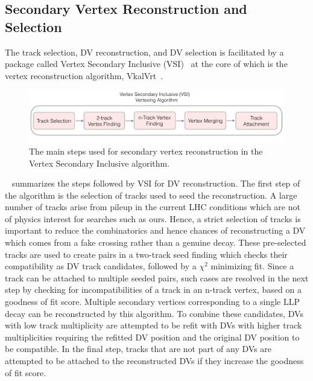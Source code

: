 \subsection{Secondary Vertex Reconstruction and Selection}
The track selection, DV reconstruction, and DV selection is facilitated by a package called Vertex Secondary Inclusive (VSI)~\cite{ATL-PHYS-PUB-2019-013} at the core of which is the vertex reconstruction algorithm, VkalVrt~\cite{Kostyukhin:685551}.

\begin{figure}[!ht]
    \centering
    \includegraphics[width=0.8\linewidth]{figures//analysis_overview/vertexing/VSIalg.png}
    \caption{The main steps used for secondary vertex reconstruction in the Vertex Secondary Inclusive algorithm.~\cite{ATL-PHYS-PUB-2019-013}}
    \label{fig:vsi-steps}
\end{figure}

~ summarizes the steps followed by VSI for DV reconstruction. The first step of the algorithm is the selection of tracks used to seed the reconstruction. A large number of tracks arise from pileup in the current LHC conditions which are not of physics interest for searches such as ours. Hence, a strict selection of tracks is important to reduce the combinatorics and hence chances of reconstructing a DV which comes from a fake crossing rather than a genuine decay. These pre-selected tracks are used to create pairs in a two-track seed finding which checks their compatibility as DV track candidates, followed by a $\chi^2$ minimizing fit. Since a track can be attached to multiple seeded pairs, such cases are resolved in the next step by checking for incompatibilities of a track in an n-track vertex, based on a goodness of fit score. Multiple secondary vertices corresponding to a single LLP decay can be reconstructed by this algorithm. To combine these candidates, DVs with low track multiplicity are attempted to be refit with DVs with higher track multiplicities requiring the refitted DV position and the original DV position to be compatible. In the final step, tracks that are not part of any DVs are attempted to be attached to the reconstructed DVs if they increase the goodness of fit score.

